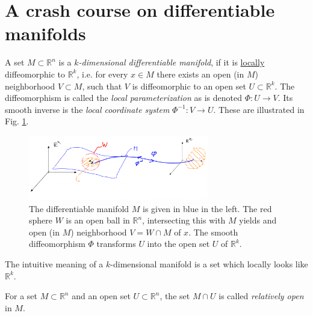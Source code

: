 \section{A crash course on differentiable manifolds}
\begin{definition}
	A set $M\subset \mathbb{R}^{n}$ is a \emph{$k$-dimensional differentiable manifold}, if it is \underline{locally} diffeomorphic to $\mathbb{R}^{k}$, i.e. for every $x\in M$ there exists an open (in $M$) neighborhood $V\subset M $, such that $V$ is diffeomorphic to an open set $U \subset \mathbb{R}^{k}$. The diffeomorphism is called the \emph{local parameterization} as is denoted $\Phi:U \to V$. Its smooth inverse is the \emph{local coordinate system} $\Phi^{-1}:V \to U$. These are illustrated in Fig. \ref{fig:diffble_mfd}.
	\begin{figure}[h!]
		\centering
		\includegraphics[width=0.7\textwidth]{figures/ch9/2diffble_mfd.png}
		\caption{The differentiable manifold $M$ is given in blue in the left. The red sphere $W$ is an open ball in  $\mathbb{R}^{n}$, intersecting this with $M$ yields and open (in $M$) neighborhood $V=W \cap M$ of $x $. The smooth diffeomorphism $\Phi $ transforms $U$ into the open set $U$ of $\mathbb{R}^{k}$.}
		\label{fig:diffble_mfd}
	\end{figure}
\end{definition}

The intuitive meaning of a $k$-dimensional manifold is a set which locally looks like $\mathbb{R}^{k}$.

\begin{definition}
	For a set $M\subset \mathbb{R}^{n}$ and an open set $U\subset \mathbb{R}^{n}$, the set $M\cap U$ is called \emph{relatively open} in $M$.	
\end{definition}

